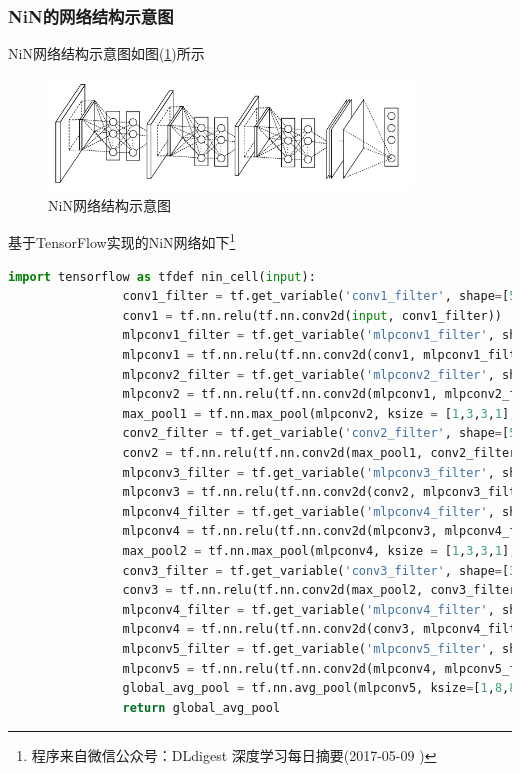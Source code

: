         \subsubsection{NiN的网络结构示意图}
            \par
            NiN网络结构示意图如图(\ref{fig:NiN网络结构示意图})所示
             \begin{figure}[H]
            \centering
            \includegraphics[height=3cm]{images/NiN_networks.jpg}
            \caption{NiN网络结构示意图}
            \label{fig:NiN网络结构示意图}
            \end{figure}
            \par
            基于TensorFlow实现的NiN网络如下\footnote{程序来自微信公众号：DLdigest 深度学习每日摘要(2017-05-09 )}
            \begin{lstlisting}[language = Python]
            import tensorflow as tfdef nin_cell(input):
                conv1_filter = tf.get_variable('conv1_filter', shape=[5, 5, 3, 192])
                conv1 = tf.nn.relu(tf.nn.conv2d(input, conv1_filter))
                mlpconv1_filter = tf.get_variable('mlpconv1_filter', shape=[1, 1, 192, 160])
                mlpconv1 = tf.nn.relu(tf.nn.conv2d(conv1, mlpconv1_filter))
                mlpconv2_filter = tf.get_variable('mlpconv2_filter', shape=[1, 1, 160, 96])
                mlpconv2 = tf.nn.relu(tf.nn.conv2d(mlpconv1, mlpconv2_filter))
                max_pool1 = tf.nn.max_pool(mlpconv2, ksize = [1,3,3,1], strides=[1,2,2,1])
                conv2_filter = tf.get_variable('conv2_filter', shape=[5, 5, 96, 192])
                conv2 = tf.nn.relu(tf.nn.conv2d(max_pool1, conv2_filter))
                mlpconv3_filter = tf.get_variable('mlpconv3_filter', shape=[1, 1, 192, 192])
                mlpconv3 = tf.nn.relu(tf.nn.conv2d(conv2, mlpconv3_filter))
                mlpconv4_filter = tf.get_variable('mlpconv4_filter', shape=[1, 1, 192, 192])
                mlpconv4 = tf.nn.relu(tf.nn.conv2d(mlpconv3, mlpconv4_filter))
                max_pool2 = tf.nn.max_pool(mlpconv4, ksize = [1,3,3,1], strides=[1,2,2,1])
                conv3_filter = tf.get_variable('conv3_filter', shape=[3, 3, 192, 192])
                conv3 = tf.nn.relu(tf.nn.conv2d(max_pool2, conv3_filter))
                mlpconv4_filter = tf.get_variable('mlpconv4_filter', shape=[1, 1, 192, 192])
                mlpconv4 = tf.nn.relu(tf.nn.conv2d(conv3, mlpconv4_filter))
                mlpconv5_filter = tf.get_variable('mlpconv5_filter', shape=[1, 1, 192, 10])
                mlpconv5 = tf.nn.relu(tf.nn.conv2d(mlpconv4, mlpconv5_filter))
                global_avg_pool = tf.nn.avg_pool(mlpconv5, ksize=[1,8,8,1])
                return global_avg_pool
            \end{lstlisting}
